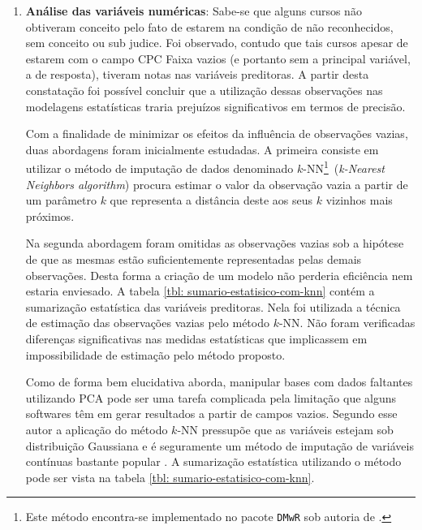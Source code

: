 \begin{enumerate}
	

	\item \textbf{Análise das variáveis numéricas}: Sabe-se que alguns cursos não obtiveram conceito pelo fato de estarem na condição de não reconhecidos, sem conceito ou sub judice. Foi observado, contudo que tais cursos apesar de estarem com o campo CPC Faixa vazios (e portanto sem a principal variável, a de resposta), tiveram notas nas variáveis preditoras. A partir desta constatação foi possível concluir que a utilização dessas observações nas modelagens estatísticas traria prejuízos significativos em termos de precisão.

	Com a finalidade de minimizar os efeitos da influência de observações vazias, duas abordagens foram inicialmente estudadas. A primeira consiste em utilizar o método de imputação de dados denominado $k$-NN\footnote{Este método encontra-se implementado no pacote \lstinline{DMwR} sob autoria de .}~(\textit{k-Nearest Neighbors algorithm}) procura estimar o valor da observação vazia a partir de um parâmetro $k$ que representa a distância deste aos seus $k$ vizinhos mais próximos.

	Na segunda abordagem foram omitidas as observações vazias sob a hipótese de que as mesmas estão suficientemente representadas pelas demais observações. Desta forma a criação de um modelo não perderia eficiência nem estaria enviesado. A tabela \ref{tbl: sumario-estatisico-com-knn} contém a sumarização estatística das variáveis preditoras. Nela foi utilizada a técnica de estimação das observações vazias pelo método $k$-NN. Não foram verificadas diferenças significativas nas medidas estatísticas que implicassem em impossibilidade de estimação pelo método proposto.

	Como  de forma bem elucidativa aborda, manipular bases com dados faltantes utilizando PCA pode ser uma tarefa complicada pela limitação que alguns softwares têm em gerar resultados a partir de campos vazios. Segundo esse autor a aplicação do método $k$-NN pressupõe que as variáveis estejam sob distribuição Gaussiana e é seguramente um método de imputação de variáveis contínuas bastante popular . A sumarização estatística utilizando o método pode ser vista na tabela \ref{tbl: sumario-estatisico-com-knn}.

	
	\end{enumerate}
\pagebreak

